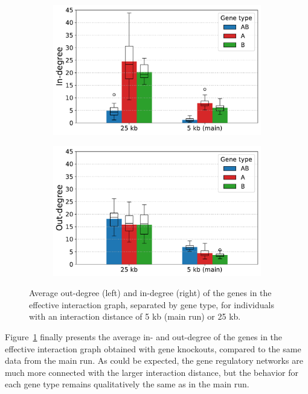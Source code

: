 \begin{figure}[H]
\centering
\begin{subfigure}[t]{0.495\textwidth}
\includegraphics[width=\textwidth]{param/interaction-25k/effective_graph_combined_in_degree.pdf}
\end{subfigure}
\begin{subfigure}[t]{0.495\textwidth}
\includegraphics[width=\textwidth]{param/interaction-25k/effective_graph_combined_out_degree.pdf}
\end{subfigure}
\caption[Average in- and out-degree of effective interaction graph nodes, with an interaction distance of 25 kb]{Average out-degree (left) and in-degree (right) of the genes in the effective interaction graph, separated by gene type, for individuals with an interaction distance of 5 kb (main run) or 25 kb.}
\label{fig:param:inter25k-degree}
\end{figure}

Figure~\ref{fig:param:inter25k-degree} finally presents the average in- and out-degree of the genes in the effective interaction graph obtained with gene knockouts, compared to the same data from the main run.
As could be expected, the gene regulatory networks are much more connected with the larger interaction distance, but the behavior for each gene type remains qualitatively the same as in the main run.

